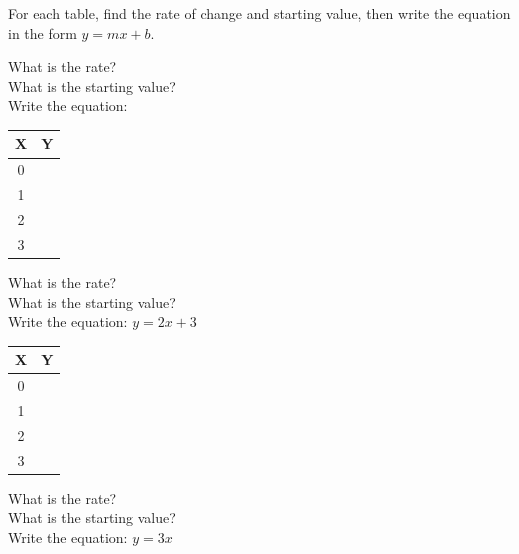 \documentclass[10pt]{article}
\theoremstyle{definition}
\theoremstyle{plain}
\numberwithin{equation}{section}
\begin{document}
\begin{multicolblock}{For each table, find the rate of change and starting value, then write the equation in the form $y=mx+b$.}
\begin{center}
\end{center}

What is the rate? \underline{\hspace{2cm}} \\
What is the starting value? \underline{\hspace{2cm}} \\
Write the equation: \underline{\hspace{4cm}}

\begin{center}
  
\begin{tabular}{|c|c|}
\hline X & Y \\
\hline 0 &  \\
\hline 1 &  \\
\hline 2 &  \\
\hline 3 &  \\
\hline
\end{tabular}

\end{center}
What is the rate? \underline{\hspace{2cm}} \\
What is the starting value? \underline{\hspace{2cm}} \\
Write the equation: \(y=2x+3\)

\begin{center}
  
\begin{tabular}{|c|c|}
\hline X & Y \\
\hline 0 &  \\
\hline 1 &  \\
\hline 2 &  \\
\hline 3 &  \\
\hline
\end{tabular}
\end{center}

What is the rate? \underline{\hspace{2cm}} \\
What is the starting value? \underline{\hspace{2cm}} \\
Write the equation: \(y=3x\)

\end{multicolblock}



\end{document}
